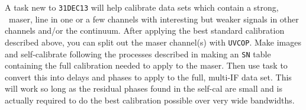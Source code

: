 
A task new to {\tt 31DEC13} will help calibrate data sets which
contain a strong, \eg\ maser, line in one or a few channels with
interesting but weaker signals in other channels and/or the continuum.
After applying the best standard calibration described above, you can
split out the maser channel(s) with {\tt UVCOP}\@.  Make images and
self-calibrate following the processes described in 
making an {\tt SN} table containing the full calibration needed to
apply to the maser.  Then use task {\tt {}} to convert this
into delays and phases to apply to the full, multi-IF data set.  This
will work so long as the residual phases found in the self-cal are
small and is actually required to do the best calibration possible
over very wide bandwidths.

